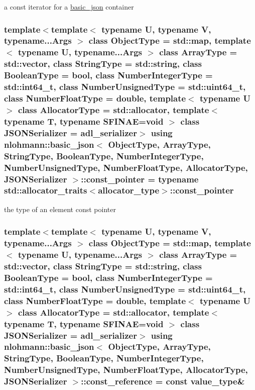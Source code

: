 a const iterator for a \hyperlink{classnlohmann_1_1basic__json}{basic\+\_\+json} container 

\subsubsection[{\texorpdfstring{const\+\_\+pointer}{const_pointer}}]{\setlength{\rightskip}{0pt plus 5cm}template$<$template$<$ typename U, typename V, typename...\+Args $>$ class Object\+Type = std\+::map, template$<$ typename U, typename...\+Args $>$ class Array\+Type = std\+::vector, class String\+Type  = std\+::string, class Boolean\+Type  = bool, class Number\+Integer\+Type  = std\+::int64\+\_\+t, class Number\+Unsigned\+Type  = std\+::uint64\+\_\+t, class Number\+Float\+Type  = double, template$<$ typename U $>$ class Allocator\+Type = std\+::allocator, template$<$ typename T, typename S\+F\+I\+N\+A\+E=void $>$ class J\+S\+O\+N\+Serializer = adl\+\_\+serializer$>$ using {\bf nlohmann\+::basic\+\_\+json}$<$ Object\+Type, Array\+Type, String\+Type, Boolean\+Type, Number\+Integer\+Type, Number\+Unsigned\+Type, Number\+Float\+Type, Allocator\+Type, J\+S\+O\+N\+Serializer $>$\+::{\bf const\+\_\+pointer} =  typename std\+::allocator\+\_\+traits$<${\bf allocator\+\_\+type}$>$\+::{\bf const\+\_\+pointer}}\hypertarget{classnlohmann_1_1basic__json_aff3d5cd2a75612364b888d8693231b58}{}\label{classnlohmann_1_1basic__json_aff3d5cd2a75612364b888d8693231b58}


the type of an element const pointer 

\subsubsection[{\texorpdfstring{const\+\_\+reference}{const_reference}}]{\setlength{\rightskip}{0pt plus 5cm}template$<$template$<$ typename U, typename V, typename...\+Args $>$ class Object\+Type = std\+::map, template$<$ typename U, typename...\+Args $>$ class Array\+Type = std\+::vector, class String\+Type  = std\+::string, class Boolean\+Type  = bool, class Number\+Integer\+Type  = std\+::int64\+\_\+t, class Number\+Unsigned\+Type  = std\+::uint64\+\_\+t, class Number\+Float\+Type  = double, template$<$ typename U $>$ class Allocator\+Type = std\+::allocator, template$<$ typename T, typename S\+F\+I\+N\+A\+E=void $>$ class J\+S\+O\+N\+Serializer = adl\+\_\+serializer$>$ using {\bf nlohmann\+::basic\+\_\+json}$<$ Object\+Type, Array\+Type, String\+Type, Boolean\+Type, Number\+Integer\+Type, Number\+Unsigned\+Type, Number\+Float\+Type, Allocator\+Type, J\+S\+O\+N\+Serializer $>$\+::{\bf const\+\_\+reference} =  const {\bf value\+\_\+type}\&}\hypertarget{classnlohmann_1_1basic__json_a4057c5425f4faacfe39a8046871786ca}{}\label{classnlohmann_1_1basic__json_a4057c5425f4faacfe39a8046871786ca}


